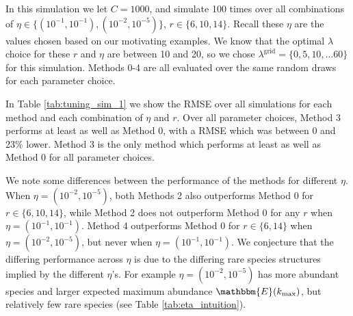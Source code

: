 \documentclass[12pt]{article}
\newcommand{\lambdagrid}{\lambda^{\text{grid}}}
\theoremstyle{break}
\theoremstyle{break}
\begin{document}

In this simulation we let $C = 1000$, and simulate 100 times over all combinations of $\eta \in \{(10^{-1}, 10^{-1}), (10^{-2}, 10^{-5}) \}$, $r \in \{6, 10, 14\}$.  Recall these $\eta$ are the values chosen based on our motivating examples.  We know that the optimal $\lambda$ choice for these $r$ and $\eta$ are between 10 and 20, so we chose $\lambdagrid = \{0, 5, 10, \dots 60\}$ for this simulation.  Methods 0-4 are all evaluated over the same random draws for each parameter choice.


In Table \ref{tab:tuning_sim_1} we show the RMSE over all simulations for each method and each combination of $\eta$ and $r$.  Over all parameter choices, Method 3 performs at least as well as Method 0, with a RMSE which was between 0 and 23\% lower.  Method 3 is the only method which performs at least as well as Method 0 for all parameter choices.

We note some differences between the performance of the methods for different $\eta.$ When $\eta = (10^{-2},10^{-5})$, both Methods 2 also outperforms Method 0 for $r \in \{6, 10, 14\}$, while Method 2 does not outperform Method 0 for any $r$ when $\eta = (10^{-1},10^{-1})$.  Method 4 outperforms Method 0 for $r \in \{6, 14\}$ when $\eta = (10^{-2},10^{-5})$, but never when $\eta = (10^{-1},10^{-1})$.
We conjecture that the differing performance across $\eta$ is due to the differing rare species structures implied by the different $\eta$'s. For example $\eta = (10^{-2},10^{-5})$ has more abundant species and larger expected maximum abundance $\mathbbm{E}(k_{\text{max}})$, but relatively few rare species (see Table \ref{tab:eta_intuition}).

\end{document}
